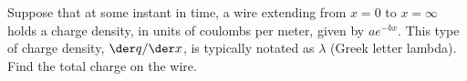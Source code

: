 Suppose that at some instant in time, a wire extending from $x=0$ to $x=\infty$ holds a charge density, in units of coulombs per meter,
        given by $ae^{-bx}$. This type of charge density, $\der q/\der x$, is typically notated as $\lambda$ (Greek letter lambda). Find the total
        charge on the wire.\answercheck
